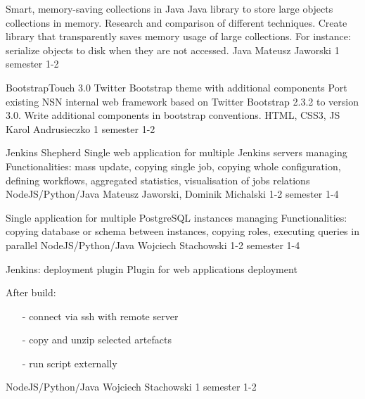 \begin{project}
{Smart, memory-saving collections in Java}
{Java library to store large objects collections in memory. Research and comparison of different techniques.} 
{ 
Create library that transparently saves memory usage of large collections. For instance: serialize objects to disk when they are not accessed.
}
{Java}
{Mateusz Jaworski}
{1 semester}
{1-2}
\end{project}
\begin{project}
{BootstrapTouch 3.0}
{Twitter Bootstrap theme with additional components} 
{ 
Port existing NSN internal web framework based on Twitter Bootstrap 2.3.2 to version 3.0. Write additional components in bootstrap conventions.
}
{HTML, CSS3, JS}
{Karol Andrusieczko}
{1 semester}
{1-2}
\end{project}
\begin{project}
{Jenkins Shepherd}
{Single web application for multiple Jenkins servers managing} 
{ 
Functionalities: mass update, copying single job, copying whole configuration, defining workflows, aggregated statistics, visualisation of jobs relations
}
{NodeJS/Python/Java}
{Mateusz Jaworski, Dominik Michalski}
{1-2 semester}
{1-4}
\end{project}
\begin{project}
{}
{Single application for multiple PostgreSQL instances managing} 
{ 
Functionalities: copying database or schema between instances, copying roles, executing queries in parallel
}
{NodeJS/Python/Java}
{Wojciech Stachowski}
{1-2 semester}
{1-4}
\end{project}
\begin{project}
{Jenkins: deployment plugin}
{Plugin for web applications deployment} 
{ 
After build:
\begin{itemize}
\item[-] connect via ssh with remote server
\item[-] copy and unzip selected artefacts
\item[-] run script externally
\end{itemize}
}
{NodeJS/Python/Java}
{Wojciech Stachowski}
{1 semester}
{1-2}
\end{project}
